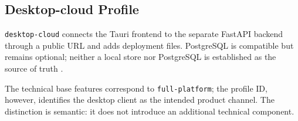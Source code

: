 \subsection{Desktop-cloud Profile}
\label{subsec:profil-desktop-cloud}

\texttt{desktop-cloud} connects the Tauri frontend to the separate FastAPI
backend through a public URL and adds deployment files. PostgreSQL is
compatible but remains optional; neither a local store nor PostgreSQL is
established as the source of truth
\parencite{kleiveist2026profiles,kleiveist2026deployment,kleiveist2026persistence}.

The technical base features correspond to \texttt{full-platform}; the profile
ID, however, identifies the desktop client as the intended product channel.
The distinction is semantic: it does not introduce an additional technical
component.
